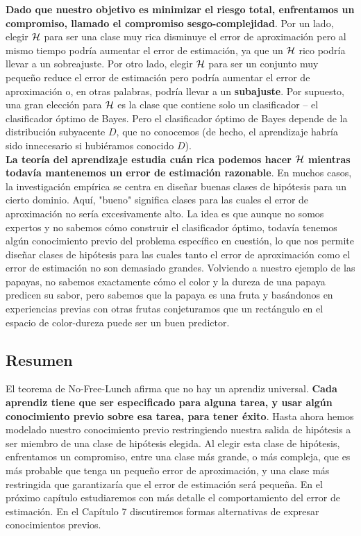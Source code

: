 \textbf{Dado que nuestro objetivo es minimizar el riesgo total, enfrentamos un compromiso, llamado el compromiso sesgo-complejidad}. Por un lado, elegir $\mathop{\mbox{$\mathcal{H}$}}\nolimits$ para ser una clase muy rica disminuye el error de aproximación pero al mismo tiempo podría aumentar el error de estimación, ya que un $\mathop{\mbox{$\mathcal{H}$}}\nolimits$ rico podría llevar a un sobreajuste. Por otro lado, elegir $\mathop{\mbox{$\mathcal{H}$}}\nolimits$ para ser un conjunto muy pequeño reduce el error de estimación pero podría aumentar el error de aproximación o, en otras palabras, podría llevar a un \textbf{subajuste}. Por supuesto, una gran elección para $\mathop{\mbox{$\mathcal{H}$}}\nolimits$ es la clase que contiene solo un clasificador – el clasificador óptimo de Bayes. Pero el clasificador óptimo de Bayes depende de la distribución subyacente $D$, que no conocemos (de hecho, el aprendizaje habría sido innecesario si hubiéramos conocido $D$).\\

\textbf{La teoría del aprendizaje estudia cuán rica podemos hacer $\mathop{\mbox{$\mathcal{H}$}}\nolimits$ mientras todavía mantenemos un error de estimación razonable}. En muchos casos, la investigación empírica se centra en diseñar buenas clases de hipótesis para un cierto dominio. Aquí, "bueno" significa clases para las cuales el error de aproximación no sería excesivamente alto. La idea es que aunque no somos expertos y no sabemos cómo construir el clasificador óptimo, todavía tenemos algún conocimiento previo del problema específico en cuestión, lo que nos permite diseñar clases de hipótesis para las cuales tanto el error de aproximación como el error de estimación no son demasiado grandes. Volviendo a nuestro ejemplo de las papayas, no sabemos exactamente cómo el color y la dureza de una papaya predicen su sabor, pero sabemos que la papaya es una fruta y basándonos en experiencias previas con otras frutas conjeturamos que un rectángulo en el espacio de color-dureza puede ser un buen predictor.

\subsection*{Resumen}
El teorema de No-Free-Lunch afirma que no hay un aprendiz universal. \textbf{Cada aprendiz tiene que ser especificado para alguna tarea, y usar algún conocimiento previo sobre esa tarea, para tener éxito}. Hasta ahora hemos modelado nuestro conocimiento previo restringiendo nuestra salida de hipótesis a ser miembro de una clase de hipótesis elegida.
Al elegir esta clase de hipótesis, enfrentamos un compromiso, entre una clase más grande, o más compleja, que es más probable que tenga un pequeño error de aproximación, y una clase más restringida que garantizaría que el error de estimación será pequeña. En el próximo capítulo estudiaremos con más detalle el comportamiento del error de estimación. En el Capítulo 7 discutiremos formas alternativas de expresar conocimientos previos.

